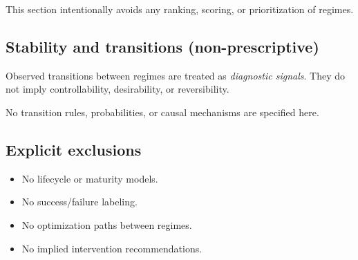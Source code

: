 This section intentionally avoids any ranking, scoring, or prioritization of regimes.

\subsection{Stability and transitions (non-prescriptive)}
Observed transitions between regimes are treated as \emph{diagnostic signals}.
They do not imply controllability, desirability, or reversibility.

No transition rules, probabilities, or causal mechanisms are specified here.

\subsection{Explicit exclusions}
\begin{itemize}
  \item No lifecycle or maturity models.
  \item No success/failure labeling.
  \item No optimization paths between regimes.
  \item No implied intervention recommendations.
\end{itemize}

